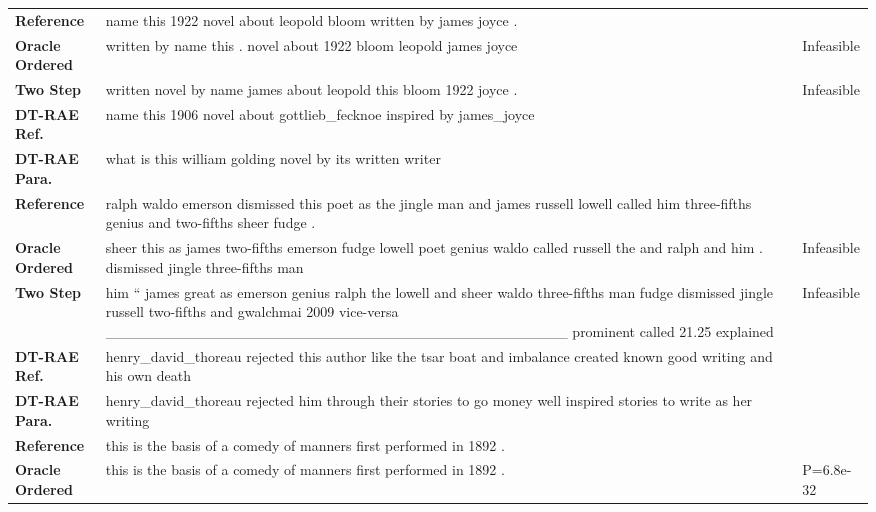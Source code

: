 \documentclass[class=article]{standalone}
\begin{document}
	\newcommand{\collenone}{3cm}
	\newcommand{\collentwo}{10cm}
	\newcommand{\collenthree}{2cm}
	\newcommand{\reftitle}{Reference}
	\newcommand{\oracletitle}{Oracle Ordered}
	\newcommand{\twosteptitle}{Two Step}
	\newcommand{\iref}{DT-RAE Ref.}
	\newcommand{\ip}{DT-RAE Para.}
	\newcommand{\bm}{VAE Mean}
	\newcommand{\bs}{VAE Sample}
	\begin{table*}
		\small
		\begin{tabular}{ p{\collenone} p{\collentwo} p{\collenthree} }
			
			\textbf{\reftitle}  & name this 1922 novel about leopold bloom written by james joyce . &  \\
			\textbf{\oracletitle}  & written by name this . novel about 1922 bloom leopold james joyce & Infeasible \\
			\textbf{\twosteptitle}  & written novel by name james about leopold this bloom 1922 joyce . & Infeasible \\
			\textbf{\iref}  & name this 1906 novel about gottlieb\_fecknoe inspired by james\_joyce &  \\
			\textbf{\ip}  & what is this william golding novel by its written writer &  \\
			\hline
			\textbf{\reftitle}  & ralph waldo emerson dismissed this poet as the jingle man and james russell lowell called him three-fifths genius and two-fifths sheer fudge . &  \\
			\textbf{\oracletitle}  & sheer this as james two-fifths emerson fudge lowell poet genius waldo called russell the and ralph and him . dismissed jingle three-fifths man & Infeasible \\
			\textbf{\twosteptitle}  & him `` james great as emerson genius ralph the lowell and sheer waldo three-fifths man fudge dismissed jingle russell two-fifths and gwalchmai 2009 vice-versa \_\_\_\_\_\_\_\_\_\_\_\_\_\_\_\_\_\_\_\_\_\_\_\_\_\_\_\_\_\_\_\_\_\_\_\_\_\_\_\_\_\_\_\_ prominent called 21.25 explained & Infeasible \\
			\textbf{\iref}  & henry\_david\_thoreau rejected this author like the tsar boat and imbalance created known good writing and his own death &  \\
			\textbf{\ip}  & henry\_david\_thoreau rejected him through their stories to go money well inspired stories to write as her writing &  \\
			\hline
			\textbf{\reftitle}  & this is the basis of a comedy of manners first performed in 1892 . &  \\
			\textbf{\oracletitle}  & this is the basis of a comedy of manners first performed in 1892 . & P=6.8e-32 \\

\end{tabular}
\end{table*}
\end{document}
